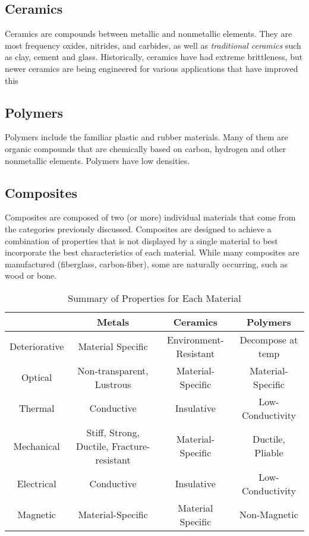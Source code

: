 \documentclass{article}
\begin{document}
\subsection{Ceramics}

Ceramics are compounds between metallic and nonmetallic elements. They are most frequency oxides, nitrides, and carbides, as well as \textit{traditional ceramics} such as clay, cement and glass. Historically, ceramics have had extreme brittleness, but newer ceramics are being engineered for various applications that have improved this

\subsection{Polymers}

Polymers include the familiar plastic and rubber materials. Many of them are organic compounds that are chemically based on carbon, hydrogen and other nonmetallic elements. Polymers have low densities.

\subsection{Composites}

Composites are composed of two (or more) individual materials that come from the categories previously discussed. Composites are designed to achieve a combination of properties that is not displayed by a single material to best incorporate the best characteristics of each material. While many composites are manufactured (fiberglass, carbon-fiber), some are naturally occurring, such as wood or bone. 

\begin{table}[H]
    \centering
    \begin{tabular}{|c|c|c|c|}
        \hline 
        & Metals & Ceramics & Polymers \\
        \hline
        Deteriorative & Material Specific & Environment-Resistant & Decompose at temp \\
        Optical & Non-transparent, Lustrous & Material-Specific & Material-Specific \\
        Thermal & Conductive & Insulative & Low-Conductivity \\ 
        Mechanical & Stiff, Strong, Ductile, Fracture-resistant & Material-Specific & Ductile, Pliable\\
        Electrical & Conductive & Insulative & Low-Conductivity \\
        Magnetic & Material-Specific & Material Specific & Non-Magnetic \\
        \hline
        
    \end{tabular}
    \caption{Summary of Properties for Each Material}
    \label{tab:properties}
\end{table}
\end{document}
